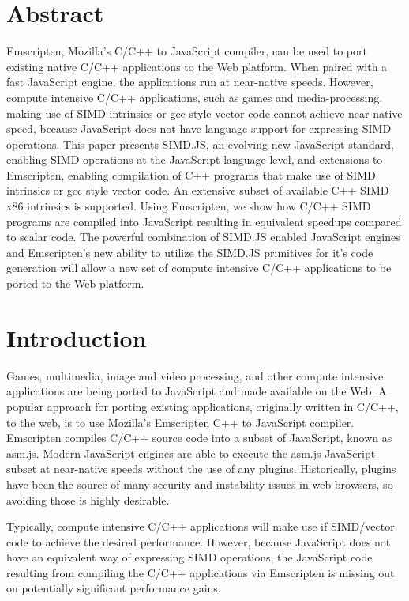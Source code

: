 \documentclass[preprint]{sigplanconf}
\begin{document}
\section{Abstract}
Emscripten, Mozilla's C/C++ to JavaScript compiler, can be used to port
existing native C/C++ applications to the Web platform.  When paired with
a fast JavaScript engine, the applications run at near-native speeds.
However, compute intensive C/C++ applications, such as games and 
media-processing, making use of SIMD intrinsics or gcc style vector code 
cannot achieve near-native speed, because JavaScript does not have 
language support for expressing SIMD operations.
This paper presents SIMD.JS, an evolving new JavaScript standard, 
enabling SIMD operations at the JavaScript language level, and extensions 
to Emscripten, enabling compilation of C++ programs that make use of 
SIMD intrinsics or gcc style vector code.  An extensive subset of 
available C++ SIMD x86 intrinsics is supported.
Using Emscripten, we show how C/C++ SIMD programs are compiled into 
JavaScript resulting in equivalent speedups compared to scalar code.  
The powerful combination of SIMD.JS enabled JavaScript engines and 
Emscripten's new ability to utilize the SIMD.JS primitives for it's 
code generation will allow a new set of compute intensive C/C++ 
applications to be ported to the Web  platform.

\section{Introduction}

Games, multimedia, image and video processing, and other compute intensive
applications are being ported to JavaScript and made available on the Web.
A popular approach for porting existing applications, originally written in C/C++,
to the web, is to use Mozilla's Emscripten C++ to JavaScript compiler. Emscripten
compiles C/C++ source code into a subset of JavaScript, known as asm.js.
Modern JavaScript engines are able to execute the asm.js JavaScript subset
at near-native speeds without the use of any plugins.  Historically, plugins have
been the source of many security and instability issues in web browsers, so
avoiding those is highly desirable.

Typically, compute intensive C/C++ applications will make use if SIMD/vector
code to achieve the desired performance. However, because JavaScript does not have an equivalent
way of expressing SIMD operations, the JavaScript code resulting from 
compiling the C/C++ applications via Emscripten is missing out on potentially 
significant performance gains.
\end{document}
